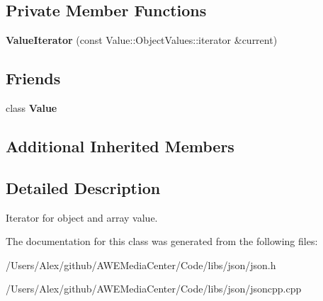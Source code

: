 \subsection*{Private Member Functions}
\begin{DoxyCompactItemize}
\item 
\hypertarget{class_json_1_1_value_iterator_afb06ea21add440c78c27dc49570460a5}{{\bfseries Value\-Iterator} (const Value\-::\-Object\-Values\-::iterator \&current)}\label{class_json_1_1_value_iterator_afb06ea21add440c78c27dc49570460a5}

\end{DoxyCompactItemize}
\subsection*{Friends}
\begin{DoxyCompactItemize}
\item 
\hypertarget{class_json_1_1_value_iterator_aeceedf6e1a7d48a588516ce2b1983d6f}{class {\bfseries Value}}\label{class_json_1_1_value_iterator_aeceedf6e1a7d48a588516ce2b1983d6f}

\end{DoxyCompactItemize}
\subsection*{Additional Inherited Members}


\subsection{Detailed Description}
Iterator for object and array value. 

The documentation for this class was generated from the following files\-:\begin{DoxyCompactItemize}
\item 
/\-Users/\-Alex/github/\-A\-W\-E\-Media\-Center/\-Code/libs/json/json.\-h\item 
/\-Users/\-Alex/github/\-A\-W\-E\-Media\-Center/\-Code/libs/json/jsoncpp.\-cpp\end{DoxyCompactItemize}
